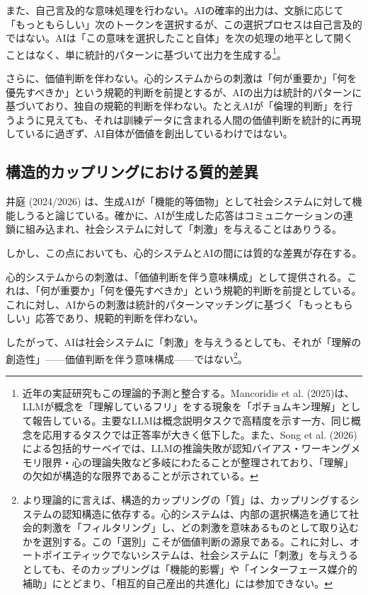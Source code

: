 \documentclass{keikaku}
\begin{document}
また、自己言及的な意味処理を行わない。AIの確率的出力は、文脈に応じて「もっともらしい」次のトークンを選択するが、この選択プロセスは自己言及的ではない。AIは「この意味を選択したこと自体」を次の処理の地平として開くことはなく、単に統計的パターンに基づいて出力を生成する\footnote{近年の実証研究もこの理論的予測と整合する。Mancoridis et al. (2025)は、LLMが概念を「理解しているフリ」をする現象を「ポチョムキン理解」として報告している\cite{vafa2025}。主要なLLMは概念説明タスクで高精度を示す一方、同じ概念を応用するタスクでは正答率が大きく低下した。また、Song et al. (2026)による包括的サーベイでは、LLMの推論失敗が認知バイアス・ワーキングメモリ限界・心の理論失敗など多岐にわたることが整理されており、「理解」の欠如が構造的な限界であることが示されている\cite{song2026}。}。

さらに、価値判断を伴わない。心的システムからの刺激は「何が重要か」「何を優先すべきか」という規範的判断を前提とするが、AIの出力は統計的パターンに基づいており、独自の規範的判断を伴わない。たとえAIが「倫理的判断」を行うように見えても、それは訓練データに含まれる人間の価値判断を統計的に再現しているに過ぎず、AI自体が価値を創出しているわけではない。

\subsection{構造的カップリングにおける質的差異}

井庭 (2024/2026) は、生成AIが「機能的等価物」として社会システムに対して機能しうると論じている\cite{iba2026}。確かに、AIが生成した応答はコミュニケーションの連鎖に組み込まれ、社会システムに対して「刺激」を与えることはありうる。

しかし、この点においても、心的システムとAIの間には質的な差異が存在する。

心的システムからの刺激は、「価値判断を伴う意味構成」として提供される。これは、「何が重要か」「何を優先すべきか」という規範的判断を前提としている。これに対し、AIからの刺激は統計的パターンマッチングに基づく「もっともらしい」応答であり、規範的判断を伴わない。

したがって、AIは社会システムに「刺激」を与えうるとしても、それが「理解の創造性」——価値判断を伴う意味構成——ではない\footnote{より理論的に言えば、構造的カップリングの「質」は、カップリングするシステムの認知構造に依存する。心的システムは、内部の選択構造を通じて社会的刺激を「フィルタリング」し、どの刺激を意味あるものとして取り込むかを選別する。この「選別」こそが価値判断の源泉である。これに対し、オートポイエティックでないシステムは、社会システムに「刺激」を与えうるとしても、そのカップリングは「機能的影響」や「インターフェース媒介的補助」にとどまり、「相互的自己産出的共進化」には参加できない\cite{esposito2001}。}。
\end{document}
